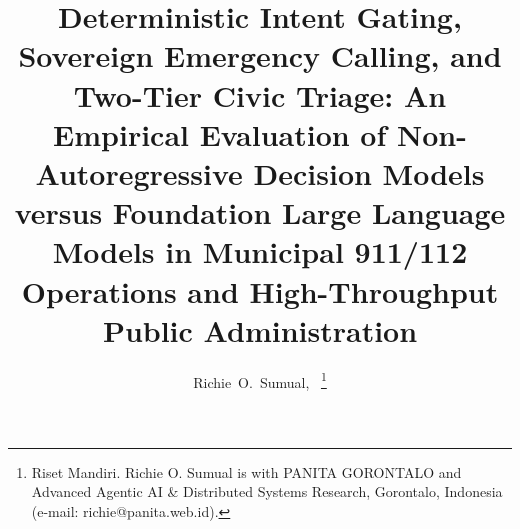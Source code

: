 \documentclass[journal,compsoc]{IEEEtran}
\begin{document}
\title{Deterministic Intent Gating, Sovereign Emergency Calling, and Two-Tier Civic Triage: An Empirical Evaluation of Non-Autoregressive Decision Models versus Foundation Large Language Models in Municipal 911/112 Operations and High-Throughput Public Administration}

\author{Richie~O.~Sumual,~%
\thanks{Riset Mandiri. Richie O. Sumual is with PANITA GORONTALO and Advanced Agentic AI \& Distributed Systems Research, Gorontalo, Indonesia (e-mail: richie@panita.web.id).}}

%

\IEEEtitleabstractindextext{%
\begin{abstract}

\end{abstract}}
\end{document}

